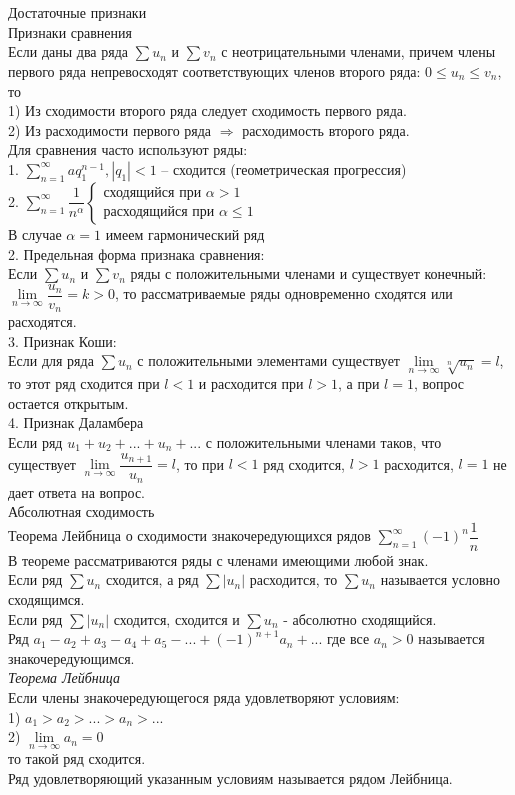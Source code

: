 \documentclass{article}
\numberwithin{equation}{section}
\begin{document}
\\\\
Достаточные признаки\\
Признаки сравнения\\
Если даны два ряда $\sum u_n$ и $\sum v_n$ с неотрицательными членами, причем члены первого ряда непревосходят соответствующих членов второго ряда: $0\leqslant u_n\leqslant v_n$, то\\
1) Из сходимости второго ряда следует сходимость первого ряда.\\
2) Из расходимости первого ряда $\Rightarrow$ расходимость второго ряда.\\
Для сравнения часто используют ряды:\\
1. $\sum\limits_{n=1}^\infty aq_1^{n-1},|q_1|<1$ -- сходится (геометрическая прогрессия)\\
2. $\sum\limits_{n=1}^\infty\dfrac{1}{n^\alpha}\begin{cases}
\mbox{сходящийся при }\alpha>1\\
\mbox{расходящийся при }\alpha\leqslant1
\end{cases}$\\
В случае $\alpha=1$ имеем гармонический ряд\\
2. Предельная форма признака сравнения:\\
Если $\sum u_n$ и $\sum v_n$ ряды с положительными членами и существует конечный: $\lim\limits_{n\rightarrow\infty}\dfrac{u_n}{v_n}=k>0$, то рассматриваемые ряды одновременно сходятся или расходятся.\\
3. Признак Коши:\\
Если для ряда $\sum u_n$ с положительными элементами существует $\lim\limits_{n\rightarrow\infty}\sqrt[n]{u_n}=l$, то этот ряд сходится при $l<1$ и расходится при $l>1$, а при $l=1$, вопрос остается открытым.\\
4. Признак Даламбера\\
Если ряд $u_1+u_2+...+u_n+...$ с положительными членами таков, что существует $\lim\limits_{n\rightarrow\infty}\dfrac{u_{n+1}}{u_n}=l$, то при $l<1$ ряд сходится, $l>1$ расходится, $l=1$ не дает ответа на вопрос.\\
Абсолютная сходимость\\
Теорема Лейбница о сходимости знакочередующихся рядов $\sum\limits_{n=1}^\infty(-1)^n\dfrac{1}{n}$\\
В теореме рассматриваются ряды с членами имеющими любой знак.\\
Если ряд $\sum u_n$ сходится, а ряд $\sum|u_n|$ расходится, то $\sum u_n$ называется условно сходящимся.\\
Если ряд $\sum|u_n|$ сходится, сходится и $\sum u_n$ - абсолютно сходящийся.\\
Ряд $a_1-a_2+a_3-a_4+a_5-...+(-1)^{n+1}a_n+...$ где все $a_n>0$ называется знакочередующимся.\\
\textit{Теорема Лейбница}\\
Если члены знакочередующегося ряда удовлетворяют условиям:\\
1) $a_1>a_2>...>a_n>...$\\
2) $\lim\limits_{n\rightarrow\infty}a_n=0$\\
то такой ряд сходится.\\
Ряд удовлетворяющий указанным условиям называется рядом Лейбница.
\end{document}
